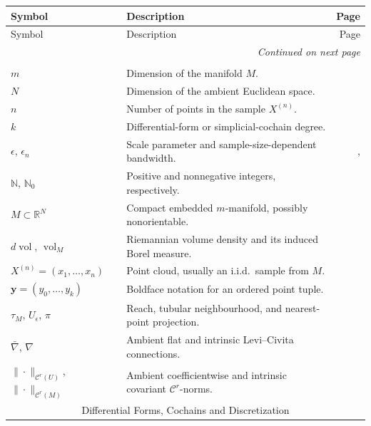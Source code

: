 \documentclass[11pt,reqno]{amsproc}
\numberwithin{equation}{section}
\newcommand{\N}{\mathbb{N}}
\newcommand{\R}{\mathbb{R}}
\newcommand{\by}{\mathbf{y}}
\newcommand{\cC}{\mathcal{C}}
\newcommand{\vol}{\operatorname{vol}}
\newcommand{\dvol}{d\!\vol}
\theoremstyle{definition}
\theoremstyle{plain}
\begin{document}
{\small
\begin{longtable}
    {@{}p{}p{}r@{}}
    \toprule
    Symbol & Description & Page\\
    \midrule
    \endfirsthead
    \toprule
    Symbol & Description & Page\\
    \midrule
    \endhead
    \midrule
    \multicolumn{3}{r}{\emph{Continued on next page}}\\
    \endfoot
    \bottomrule
    \endlastfoot
    \multicolumn{3}{c}{Global Parameters and Conventions} \\ \midrule
    $m$ & Dimension of the manifold $M$. & \pageref{sec:geometric_prelim}\\
    $N$ & Dimension of the ambient Euclidean space. & \pageref{sec:geometric_prelim}\\
    $n$ & Number of points in the sample $X^{(n)}$. & \pageref{sec:discretization}\\
    $k$ & Differential-form or simplicial-cochain degree. & \pageref{ssec:differential_forms}\\
    $\epsilon$, $\epsilon_n$ & Scale parameter and sample-size-dependent bandwidth. & \pageref{sec:discretization}, \pageref{thm:main_uc}\\
    $\N$, $\N_0$ & Positive and nonnegative integers, respectively. & \pageref{not:global_conventions}\\
    $M\subset\R^N$ & Compact embedded $m$-manifold, possibly nonorientable. & \pageref{sec:geometric_prelim}\\
    $\dvol$, $\vol_M$ & Riemannian volume density and its induced Borel measure. & \pageref{sec:geometric_prelim}\\
    $X^{(n)}=(x_1,\ldots,x_n)$ & Point cloud, usually an i.i.d.\ sample from $M$. & \pageref{sec:discretization}\\
    $\by=(y_0,\ldots,y_k)$ & Boldface notation for an ordered point tuple. & \pageref{ssec:euclidean_derham}\\
    $\tau_M$, $U_\epsilon$, $\pi$ & Reach, tubular neighbourhood, and nearest-point projection. & \pageref{ssec:reach_tubular}\\
    $\bar\nabla$, $\nabla$ & Ambient flat and intrinsic Levi--Civita connections. & \pageref{ssec:ambient_forms}\\
    $\|\cdot\|_{\cC^r(U)}$, $\|\cdot\|_{\cC^r(M)}$ & Ambient coefficientwise and intrinsic covariant $\cC^r$-norms. & \pageref{ssec:ambient_forms}\\ \midrule
    \multicolumn{3}{c}{Differential Forms, Cochains and Discretization} \\ \midrule

\end{longtable}}
\end{document}

